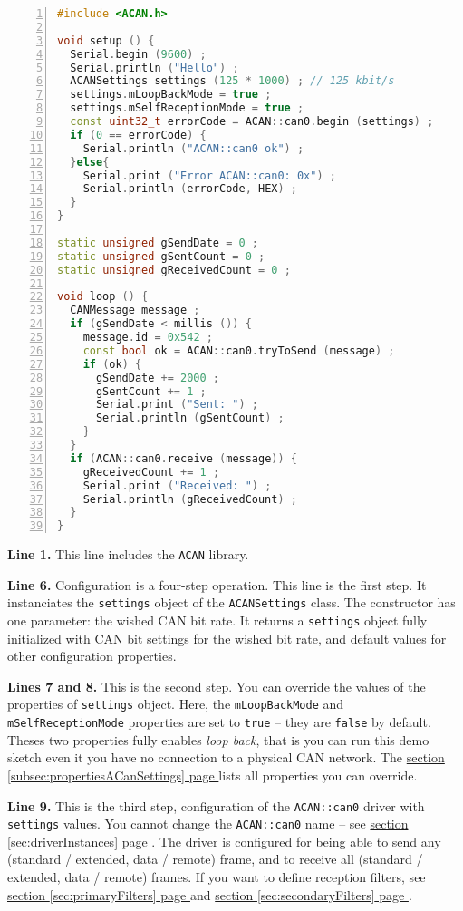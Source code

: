 \documentclass[10pt, a4paper, obeyspaces, openany]{extarticle}
\newcommand\refSectionPage[1]{\hyperref[sec:#1]{section \ref*{sec:#1} page \pageref{sec:#1}}}
\newcommand\refSubsectionPage[1]{\hyperref[subsec:#1]{section \ref*{subsec:#1} page \pageref{subsec:#1}}}
\begin{document}
{ \small\begin{lstlisting}[language=c++,numbers=left]
#include <ACAN.h>

void setup () {
  Serial.begin (9600) ;
  Serial.println ("Hello") ;
  ACANSettings settings (125 * 1000) ; // 125 kbit/s
  settings.mLoopBackMode = true ;
  settings.mSelfReceptionMode = true ;
  const uint32_t errorCode = ACAN::can0.begin (settings) ;
  if (0 == errorCode) {
    Serial.println ("ACAN::can0 ok") ;
  }else{
    Serial.print ("Error ACAN::can0: 0x") ;
    Serial.println (errorCode, HEX) ;
  }
}

static unsigned gSendDate = 0 ;
static unsigned gSentCount = 0 ;
static unsigned gReceivedCount = 0 ;

void loop () {
  CANMessage message ;
  if (gSendDate < millis ()) {
    message.id = 0x542 ;
    const bool ok = ACAN::can0.tryToSend (message) ;
    if (ok) {
      gSendDate += 2000 ;
      gSentCount += 1 ;
      Serial.print ("Sent: ") ;
      Serial.println (gSentCount) ;
    }
  }
  if (ACAN::can0.receive (message)) {
    gReceivedCount += 1 ;
    Serial.print ("Received: ") ;
    Serial.println (gReceivedCount) ;
  }
}
\end{lstlisting}}

{\bf Line 1.} This line includes the \texttt{ACAN} library.

{\bf Line 6.} Configuration is a four-step operation. This line is the first step. It instanciates the \texttt{settings} object of the \texttt{ACANSettings} class. The constructor has one parameter: the wished CAN bit rate. It returns a \texttt{settings} object fully initialized with CAN bit settings for the wished bit rate, and default values for other configuration properties.

{\bf Lines 7 and 8.} This is the second step. You can override the values of the properties of \texttt{settings} object. Here, the \texttt{mLoopBackMode} and \texttt{mSelfReceptionMode} properties are set to \texttt{true} -- they are \texttt{false} by default. Theses two properties fully enables \emph{loop back}, that is you can run this demo sketch even it you have no connection to a physical CAN network. The \refSubsectionPage{propertiesACanSettings} lists all properties you can override.

{\bf Line 9.} This is the third step, configuration of the \texttt{ACAN::can0} driver with \texttt{settings} values. You cannot change the \texttt{ACAN::can0} name -- see \refSectionPage{driverInstances}. The driver is configured for being able to send any (standard / extended, data / remote) frame, and to receive all (standard / extended, data / remote) frames. If you want to define reception filters, see \refSectionPage{primaryFilters} and  \refSectionPage{secondaryFilters}.
\end{document}
